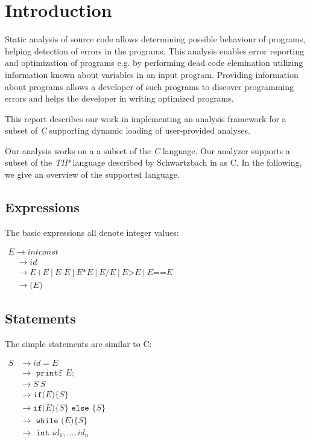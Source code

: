 \section{Introduction}

Static analysis of source code allows determining possible behaviour of programs, helping detection of errors in the programs. This analysis enables error reporting and optimization of programs e.g. by performing dead code elemination utilizing information known about variables in an input program. Providing information about programs allows a developer of such programs to discover programming errors and helps the developer in writing optimized programs.  

This report describes our work in implementing an analysis framework for a subset of \textit{C} supporting dynamic loading of user-provided analyses. 

\newpar Our analysis works on a a subset of the \textit{C} language. Our analyzer supports a subset of the \textit{TIP} language described by Schwartzbach in \cite{spa} as C. In the following, we give an overview of the supported language.

\subsection{Expressions}
The basic expressions all denote integer values:
\begin{center}
    $\begin{array}{l}{E \rightarrow { intconst }} \\ {\quad \rightarrow { id }} \\ {\quad \rightarrow E\texttt{+}E\:|\:E\texttt{-}E\:|\:E \texttt{*} E\:|\:E \texttt{/} E\:|\:E\texttt{>}E\:|\:E\texttt{==}E} \\ \quad \rightarrow\texttt{(}E\texttt{)}\end{array}$    
\end{center}

\subsection{Statements}
The simple statements are similar to C:
\begin{center}
    $\begin{aligned} S & \rightarrow i d=E \\ & \rightarrow \texttt { printf } E ; \\ & \rightarrow S\:S \\ & \rightarrow \texttt{if(}E\texttt{)}\{S\} \\ & \rightarrow \texttt{if(} E \texttt{)}\{S\} \texttt { else }\{S\} \\ & \rightarrow \texttt { while (}E\texttt{)}\{S\} \\ & \rightarrow \texttt { int } i d_{1}, \ldots, i d_{n} \end{aligned}$
\end{center}

